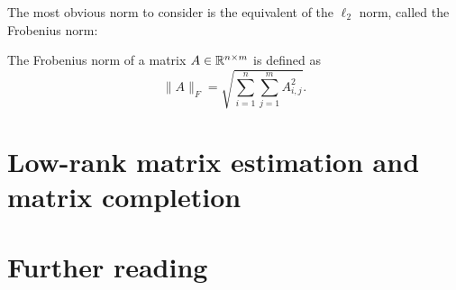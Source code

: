 \documentclass[11pt,nocut]{article}
\begin{document}
The most obvious norm to consider is the equivalent of the $\ell_2$ norm, called the Frobenius norm:
\begin{definition}
	The Frobenius norm of a matrix $A \in \mathbb{R}^{n \times m}$ is defined as
	$$
	\|A\|_F = \sqrt{\sum_{i=1}^n \sum_{j=1}^m A_{i,j}^2}. 
	$$
\end{definition}

\section{Low-rank matrix estimation and matrix completion}



\section*{Further reading}


\vspace{1cm}
\centerline{}




\end{document}
